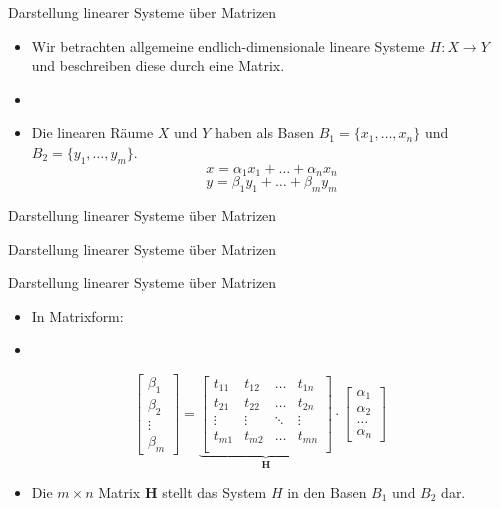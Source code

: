 \documentclass[14pt, aspectratio=169, handout]{beamer}
\begin{document}
\begin{frame}{Darstellung linearer Systeme über Matrizen}
    \begin{itemize}
        \item Wir betrachten allgemeine endlich-dimensionale lineare Systeme $H:X \to Y$ und beschreiben diese durch eine Matrix.
        \item[] 
        \item Die linearen Räume $X$ und $Y$ haben als Basen $B_1 = \{x_1, \dots, x_n\}$ und $B_2 = \{ y_1, \dots, y_m \}$.
        $$x = \alpha_1 x_1 + \dots + \alpha_n x_n$$
        $$y = \beta_1 y_1 + \dots + \beta_m y_m$$
    \end{itemize}
\end{frame}

\begin{frame}{Darstellung linearer Systeme über Matrizen}
    
\end{frame}

\begin{frame}{Darstellung linearer Systeme über Matrizen}
    
\end{frame}

\begin{frame}{Darstellung linearer Systeme über Matrizen}
    \begin{itemize}
        \item In Matrixform:
        \item[] 
    \end{itemize}
    $$\begin{bmatrix}
        \beta_1 \\ \beta_2 \\ \vdots \\ \beta_m
    \end{bmatrix} = \underbrace{\begin{bmatrix}
        t_{11} & t_{12} & \dots & t_{1n} \\
        t_{21} & t_{22} & \dots & t_{2n} \\
        \vdots & \vdots & \ddots & \vdots \\
        t_{m1} & t_{m2} & \dots & t_{mn} \\
    \end{bmatrix}}_{\mathbf{H}} \cdot \begin{bmatrix}
        \alpha_1 \\ \alpha_2 \\ \dots \\ \alpha_n
    \end{bmatrix}$$
    \begin{itemize}
        \item Die $m \times n$ Matrix $\mathbf{H}$ stellt das System $H$ in den Basen $B_1$ und $B_2$ dar.
    \end{itemize}
\end{frame}
\end{document}
